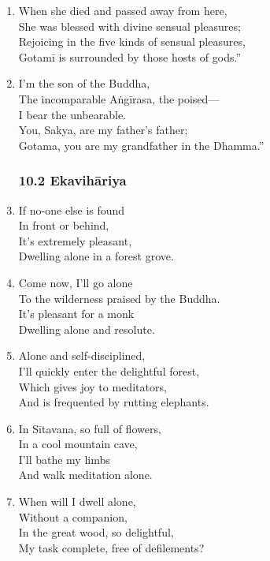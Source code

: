 \documentclass[10pt, openany]{book}
\newcommand*{\vleftofline}[1]{\leavevmode\llap{#1}}
\begin{document}
\begin{enumerate}
\item When she died and passed away from here,\\
She was blessed with divine sensual pleasures;\\
Rejoicing in the five kinds of sensual pleasures,\\
Gotamī is surrounded by those hosts of gods.”

\item \vleftofline{“}I’m the son of the Buddha, \\
The incomparable Aṅgīrasa, the poised—\\
I bear the unbearable.\\
You, Sakya, are my father’s father;\\
Gotama, you are my grandfather in the Dhamma.”

\subsubsection*{10.2 Ekavihāriya}

\item If no-one else is found\\
In front or behind,\\
It’s extremely pleasant,\\
Dwelling alone in a forest grove.

\item Come now, I’ll go alone\\
To the wilderness praised by the Buddha.\\
It’s pleasant for a monk\\
Dwelling alone and resolute.

\item Alone and self-disciplined,\\
I’ll quickly enter the delightful forest,\\
Which gives joy to meditators,\\
And is frequented by rutting elephants.

\item In Sītavana, so full of flowers,\\
In a cool mountain cave,\\
I’ll bathe my limbs\\
And walk meditation alone.

\item When will I dwell alone,\\
Without a companion,\\
In the great wood, so delightful,\\
My task complete, free of defilements?


\end{enumerate}
\end{document}
